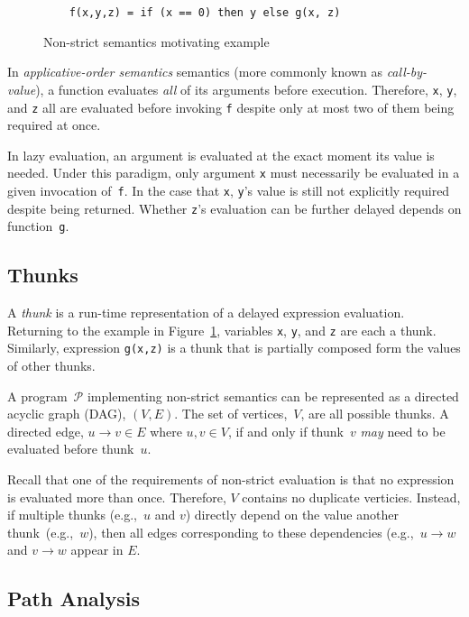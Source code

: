 \documentclass[11pt]{article}
\begin{document}
\begin{figure}[h]
  \centering
  \begin{lstlisting}
    f(x,y,z) = if (x == 0) then y else g(x, z)
  \end{lstlisting}
  \caption{Non-strict semantics motivating example}
  \label{fig:LazyEvalExample}
\end{figure}

In \textit{applicative-order semantics} semantics (more commonly known as \textit{call-by-value}), a function evaluates \textit{all} of its arguments before execution.  Therefore, \texttt{x}, \texttt{y}, and \texttt{z} all are evaluated before invoking \texttt{f} despite only at most two of them being required at once.

In lazy evaluation, an argument is evaluated at the exact moment its value is needed.  Under this paradigm, only argument \texttt{x} must necessarily be evaluated in a given invocation of~\texttt{f}. In the case that \texttt{x}, \texttt{y}'s value is still not explicitly required despite being returned.  Whether \texttt{z}'s evaluation can be further delayed depends on function~\texttt{g}.

\subsection{Thunks}\label{sec:Thunks}

A \textit{thunk} is a run-time representation of a delayed expression evaluation.  Returning to the example in Figure~\ref{fig:LazyEvalExample}, variables \texttt{x}, \texttt{y}, and \texttt{z} are each a thunk.  Similarly, expression \texttt{g(x,z)} is a thunk that is partially composed form the values of other thunks.

A program~$\mathcal{P}$ implementing non-strict semantics can be represented as a directed acyclic graph (DAG), $(V,E)$.  The set of vertices,~$V$, are all possible thunks.  A directed edge, ${u \rightarrow v \in E}$ where ${u,v\in V}$, if and only if thunk~$v$ \textit{may} need to be evaluated before thunk~$u$.

Recall that one of the requirements of non-strict evaluation is that no expression is evaluated more than once. Therefore, $V$ contains no duplicate verticies.  Instead, if multiple thunks (e.g.,~$u$ and $v$) directly depend on the value another thunk~(e.g.,~$w$), then all edges corresponding to these dependencies (e.g.,~${u\rightarrow w}$ and ${v\rightarrow w}$ appear in $E$.


\subsection{Path Analysis}\label{sec:PathAnalysis}
\end{document}
